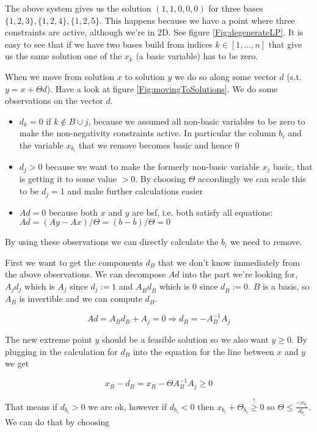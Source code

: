 
The above system gives us the solution $(1,1,0,0,0)$ for three bases $\{1,2,3\},\{1,2,4\},\{1,2,5\}$. This happens because we have a point where three constraints are active, although we're in 2D. See figure \ref{Fig:degenerateLP}. It is easy to see that if we have two bases build from indices $k\in [1,\ldots,n]$ that give us the same solution one of the $x_k$ (a basic variable) has to be zero. %


When we move from solution $x$ to solution $y$ we do so along some vector $d$ (s.t. $y=x+\Theta d$). Have a look at figure \ref{Fig:movingToSolutions}. We do some observations on the vector $d$. 

\begin{itemize}
\item $d_k=0$ if $k\not \in B \cup j$, because we assumed all non-basic variables to be zero to make the non-negativity constraints active. In particular the column $b_i$ and the variable $x_{b_i}$ that we remove becomes basic and hence 0
\item $d_j>0$ because we want to make the formerly non-basic variable $x_j$ basic, that is getting it to some value $>0$. By choosing $\Theta$ accordingly we can scale this to be $d_j=1$ and make further calculations easier
\item $Ad = 0$ because both $x$ and $y$ are bsf, i.e. both satisfy all equations: $Ad = (Ay-Ax)/\Theta = (b-b)/\Theta = 0$
\end{itemize}

By using these observations we can directly calculate the $b_i$ we need to remove.

First we want to get the components $d_B$ that we don't know immediately from the above observations. We can decompose $Ad$ into the part we're looking for, $A_j d_j$ which is $A_j$ since $d_j:=1$ and $A_{\bar B} d_{\bar B}$ which is 0 since $d_{\bar B}:=0$. $B$ is a basis, so $A_B$ is invertible and we can compute $d_B$.

\[Ad = A_B d_B+A_j = 0 \Rightarrow d_B = -A^{-1}_B A_j\]

The new extreme point $y$ should be a feasible solution so we also want $y\geq 0$. By plugging in the calculation for $d_B$ into the equation for the line between $x$ and $y$ %
we get

\[x_B - d_B = x_B - \Theta A_B^{-1} A_j \geq 0\]

That means if $d_{b_i}>0$ we are ok, however if $d_{b_i} <0$ then $x_{b_i} +\Theta_{b_i} \stackrel{!}{\geq} 0$ so $\Theta \leq \frac{-x_{b_i}}{d_{b_i}}$. We can do that by choosing

